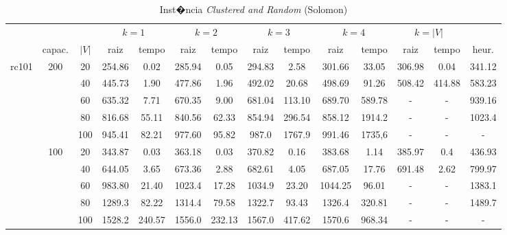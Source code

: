\documentclass[12pt]{article}
\begin{document}
\vspace{1cm}

\begin{table}[!htb]
\centering
\footnotesize
\begin{tabular}{|c|c|c|c|c|c|c|c|c|c|c|c|c|c|}
\cline{4-13}
\multicolumn{3}{c}{} & \multicolumn{2}{|c}{$k=1$} & \multicolumn{2}{|c|}{$k=2$} & \multicolumn{2}{c|}{$k=3$} & \multicolumn{2}{c|}{$k=4$} & \multicolumn{2}{|c|}{$k=|V|$} & \multicolumn{1}{c}{}\\
\cline{2-14}
\multicolumn{1}{c}{} & \multicolumn{1}{|c}{capac.} & \multicolumn{1}{|c|}{$|V|$} & \multicolumn{1}{|c|}{raiz} & \multicolumn{1}{|c|}{tempo} & \multicolumn{1}{|c|}{raiz} & \multicolumn{1}{|c|}{tempo} & \multicolumn{1}{|c|}{raiz} & \multicolumn{1}{|c|}{tempo} & \multicolumn{1}{|c|}{raiz} & \multicolumn{1}{|c|}{tempo} & \multicolumn{1}{|c|}{raiz} & \multicolumn{1}{|c|}{tempo} & \multicolumn{1}{|c|}{heur.} \\
\hline
\multirow{10}{*}{rc101}
& \multirow{5}{*}{200} & 20 & 254.86 & 0.02 & 285.94 & 0.05 & 294.83 & 2.58 & 301.66 & 33.05 & 306.98 & 0.04 & 341.12\\
\cline{3-14}
& \multirow{5}{*}{} & 40 & 445.73 & 1.90 & 477.86 & 1.96 & 492.02 & 20.68 & 498.69 & 91.26 & 508.42 & 414.88 & 583.23\\
\cline{3-14}
& \multirow{5}{*}{} & 60 & 635.32 & 7.71 & 670.35 & 9.00 & 681.04 & 113.10 & 689.70 & 589.78 & - & - & 939.16\\
\cline{3-14}
& \multirow{5}{*}{} & 80 & 816.68 & 55.11 & 840.56 & 62.33 & 854.94 & 296.54 & 858.12 & 1914.2 & - & - & 1023.4 \\
\cline{3-14}
& \multirow{5}{*}{} & 100 & 945.41 & 82.21 & 977.60 & 95.82 & 987.0 & 1767.9 & 991.46 & 1735,6 & - & - & - \\
\cline{2-14}
& \multirow{5}{*}{100} & 20 & 343.87 & 0.03 & 363.18 & 0.03 & 370.82 & 0.16 & 383.68 & 1.14 & 385.97 & 0.4 & 436.93\\
\cline{3-14}
& \multirow{5}{*}{} & 40 & 644.05 & 3.65 & 673.36 & 2.88 & 682.61 & 4.05 & 687.05 & 17.76 & 691.48 & 2.62 & 799.97\\
\cline{3-14}
& \multirow{5}{*}{} & 60 & 983.80 & 21.40 & 1023.4 & 17.28 & 1034.9 & 23.20 & 1044.25 & 96.01 & - & - & 1383.1\\
\cline{3-14}
& \multirow{5}{*}{} & 80 & 1289.3 & 82.22 & 1314.4 & 79.58 & 1322.7 & 93.43 & 1326.4 & 320.81 & - & - & 1489.7\\ 
\cline{3-14}
& \multirow{5}{*}{} & 100 & 1528.2 & 240.57 & 1556.0 & 232.13 & 1567.0 & 417.62 & 1570.6 & 968.34 & - & - & -\\
\hline
\end{tabular}
\caption{Inst�ncia \emph{Clustered and Random} (Solomon)}
\label{tab:different-dynamic-approaches}
\end{table}
\end{document}
